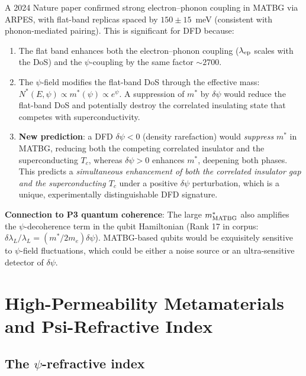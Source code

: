 \documentclass[11pt]{article}
\begin{document}
A 2024 Nature paper confirmed strong electron--phonon coupling in MATBG via
ARPES, with flat-band replicas spaced by $150 \pm 15$~meV (consistent with
phonon-mediated pairing). This is significant for DFD because:

\begin{enumerate}
\item The flat band enhances both the electron--phonon coupling
  ($\lambda_{\rm ep}$ scales with the DoS) and the $\psi$-coupling by
  the same factor $\sim 2700$.
\item The $\psi$-field modifies the flat-band DoS through the effective
  mass: $N^*(E,\psi) \propto m^*(\psi) \propto e^{\psi}$. A suppression
  of $m^*$ by $\delta\psi$ would reduce the flat-band DoS and potentially
  destroy the correlated insulating state that competes with superconductivity.
\item \textbf{New prediction}: a DFD $\delta\psi < 0$ (density rarefaction)
  would \emph{suppress} $m^*$ in MATBG, reducing both the competing
  correlated insulator and the superconducting $T_c$, whereas
  $\delta\psi > 0$ enhances $m^*$, deepening both phases. This predicts
  a \emph{simultaneous enhancement of both the correlated insulator gap
  and the superconducting $T_c$} under a positive $\delta\psi$ perturbation,
  which is a unique, experimentally distinguishable DFD signature.
\end{enumerate}

\textbf{Connection to P3 quantum coherence}: The large $m^*_{\rm MATBG}$
also amplifies the $\psi$-decoherence term in the qubit Hamiltonian
(Rank 17 in corpus: $\delta\lambda_L/\lambda_L = (m^*/2m_e)\delta\psi$).
MATBG-based qubits would be exquisitely sensitive to $\psi$-field fluctuations,
which could be either a noise source or an ultra-sensitive detector of
$\delta\psi$.

\section{High-Permeability Metamaterials and Psi-Refractive Index}
\label{sec:metamaterials}

\subsection{The $\psi$-refractive index}
\end{document}
